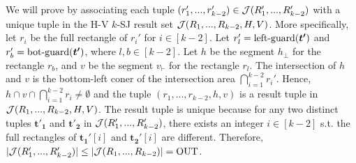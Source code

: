 
 We will prove by associating each tuple $(r_1',...,r_{k-2}')\in \mathcal{J}(R_1',...,R_{k-2}')$ with a unique tuple in the H-V $k$-SJ result set $\mathcal{J}(R_1,...,R_{k-2},H,V)$. More specifically, let $r_i$ be the full rectangle of $r_i'$ for $i\in[k-2]$. Let $r'_l = \mathrm{left\text{-}guard}(\textrm{\boldmath${t'}$})$ and $r'_b = \mathrm{bot\text{-}guard}(\textrm{\boldmath${t'}$})$, where $l,b\in[k-2]$. Let $h$ be the segment $h_\bot$ for the rectangle $r_b$, and $v$ be the segment $v_\vdash$ for the rectangle $r_l$. The intersection of $h$ and $v$ is the bottom-left coner of the intersection area $\bigcap_{i = 1}^{k-2}r_i'$. Hence, $h\cap v\cap \bigcap_{i = 1}^{k-2}r_i \neq \emptyset$ and the tuple $(r_1,...,r_{k-2},h,v)$ is a result tuple in $\mathcal{J}(R_1,...,R_{k-2},H,V)$. The result tuple is unique because for any two distinct tuples $\bm{t'_1}$ and $\bm{t'_2}$ in $\mathcal{J}(R_1',...,R_{k-2}')$, there exists an integer $i \in [k-2]$ s.t. the full rectangles of $\bm{t_1'}[i]$ and $\bm{t_2'}[i]$ are different. Therefore, $|\mathcal{J}(R_1',...,R_{k-2}')| \leq |\mathcal{J}(R_1,...,R_{k-2})| = \mathrm{OUT}$.








